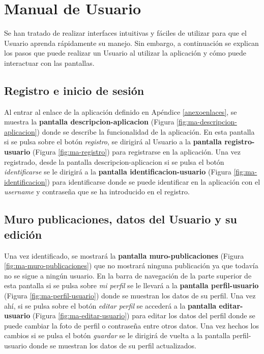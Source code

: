     




    



\section{Manual de Usuario}

Se han tratado de realizar interfaces intuitivas y fáciles de utilizar para que el Usuario aprenda rápidamente su manejo. Sin embargo, a continuación se explican los pasos que puede realizar un Usuario al utilizar la aplicación y cómo puede interactuar con las pantallas.

\subsection{Registro e inicio de sesión}

Al entrar al enlace de la aplicación definido en Apéndice \ref{anexoenlaces}, se muestra la \textbf{pantalla descripcion-aplicacion} (Figura \ref{fig:ma-descripcion-aplicacion}) donde se describe la funcionalidad de la aplicación. En esta pantalla si se pulsa sobre el botón \textit{registro}, se dirigirá al Usuario a la \textbf{pantalla registro-usuario} (Figura \ref{fig:ma-registro}) para registrarse en la aplicación. Una vez registrado, desde la pantalla descripcion-aplicacion si se pulsa el botón \textit{identificarse} se le dirigirá a la \textbf{pantalla identificacion-usuario} (Figura \ref{fig:ma-identificacion}) para identificarse donde se puede identificar en la aplicación con el \textit{username} y contraseña que se ha introducido en el registro.

\subsection{Muro publicaciones, datos del Usuario y su edición}

Una vez identificado, se mostrará la \textbf{pantalla muro-publicaciones} (Figura \ref{fig:ma-muro-publicaciones}) que no mostrará ninguna publicación ya que todavía no se sigue a ningún usuario. En la barra de navegación de la parte superior de esta pantalla si se pulsa sobre \textit{mi perfil} se le llevará a la \textbf{pantalla perfil-usuario} (Figura \ref{fig:ma-perfil-usuario}) donde se muestran los datos de su perfil. Una vez ahí, si se pulsa sobre el botón \textit{editar perfil} se accederá a la \textbf{pantalla editar-usuario} (Figura \ref{fig:ma-editar-usuario}) para editar los datos del perfil donde se puede cambiar la foto de perfil o contraseña entre otros datos. Una vez hechos los cambios si se pulsa el botón \textit{guardar} se le dirigirá de vuelta a la pantalla perfil-usuario donde se muestran los datos de su perfil actualizados.


